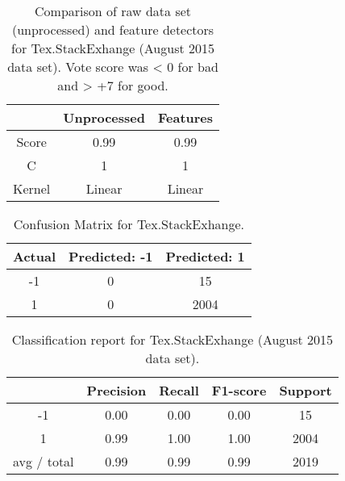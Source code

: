 \begin{table}[!h]%
	\centering
	\begin{tabular}{| c | c | c |}
		\hline
		~ 			& Unprocessed		& Features	\\ \hline
		Score 		& 0.99				& 0.99		\\ \hline
		C			& 1					& 1			\\ \hline
		Kernel		& Linear			& Linear	\\ \hline
	\end{tabular}
	\caption{Comparison of raw data set (unprocessed) and feature detectors for Tex.StackExhange (August 2015 data set). Vote score was < 0 for bad and > +7 for good.}
	\label{tab:singular_feature_detector_tex}
\end{table}

\begin{table}[!h]%
	\centering
	\begin{tabular}{| c | c | c |}
		\hline
		Actual 		& Predicted: -1	& Predicted: 1	\\ \hline
		-1			& 0			& 15				\\ \hline
		1			& 0			& 2004				\\ \hline
	\end{tabular}
	\caption{Confusion Matrix for Tex.StackExhange.}
	\label{tab:confusion_matrix_tex}
\end{table}

\begin{table}[!h]%
	\centering
	\begin{tabular}{| c | c | c | c | c |}
		\hline
		~				& Precision		& Recall	& F1-score		& Support	\\ \hline
		-1      		& 0.00			& 0.00		& 0.00			& 15		\\ \hline
		1       		& 0.99			& 1.00		& 1.00			& 2004		\\ \hline
		avg / total		& 0.99			& 0.99		& 0.99			& 2019		\\ \hline
	\end{tabular}
	\caption{Classification report for Tex.StackExhange (August 2015 data set).}
	\label{tab:tex_classification_report}
\end{table}
